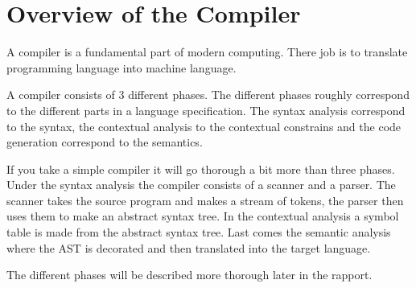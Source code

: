 \section{Overview of the Compiler}


A compiler is a fundamental part of modern computing. There job is to translate programming language into machine language.

A compiler consists of 3 different phases. The different phases roughly correspond to the different parts in a language specification. The syntax analysis correspond to the syntax, the contextual analysis to the contextual constrains and the code generation correspond to the semantics.


If you take a simple compiler it will go thorough a bit more than three phases. Under the syntax analysis the compiler consists of a scanner and a parser. The scanner takes the source program and makes a stream of tokens, the parser then uses them to make an abstract syntax tree. In the contextual analysis a symbol table is made from the abstract syntax tree. Last comes the semantic analysis where the AST is decorated and then translated into the target language.

The different phases will be described more thorough later in the rapport. 

